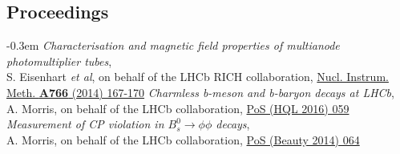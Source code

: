 \documentclass[contbibnum,titleabove]{simplecv}
\begin{document}
	\subsection{Proceedings}
	\begin{thebibliography}{2}
		\itemsep-0.3em
		\textit{Characterisation and magnetic field properties of multianode photomultiplier tubes},\\S. Eisenhart \textit{et al}, on behalf of the LHCb RICH collaboration, \href{http://dx.doi.org/10.1016/j.nima.2014.05.036}{Nucl. Instrum. Meth. \textbf{A766} (2014) 167-170}
		\textit{Charmless b-meson and b-baryon decays at LHCb},\\A. Morris, on behalf of the LHCb collaboration, \href{https://pos.sissa.it/cgi-bin/reader/contribution.cgi?id=274/059}{PoS (HQL 2016) 059}
		\textit{Measurement of CP violation in $B^0_s \to \phi\phi$ decays},\\A. Morris, on behalf of the LHCb collaboration, \href{https://pos.sissa.it/cgi-bin/reader/contribution.cgi?id=216/064}{PoS (Beauty 2014) 064}
	\end{thebibliography}
\end{document}

